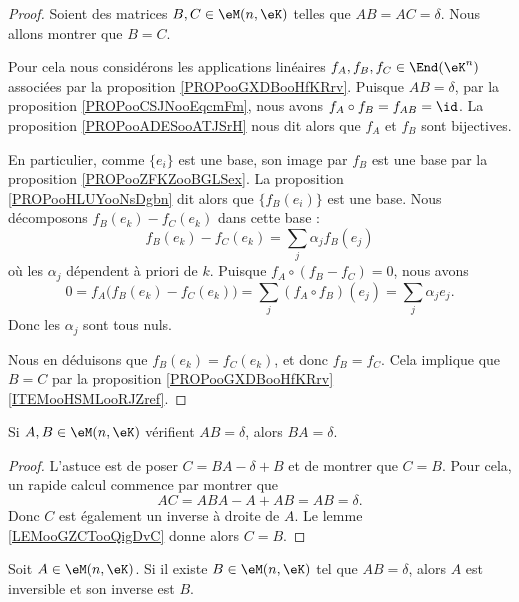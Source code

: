 \begin{proof}
	Soient des matrices \( B,C\in \eM(n,\eK)\) telles que \( AB=AC=\delta\). Nous allons montrer que \( B=C\).

	Pour cela nous considérons les applications linéaires \( f_A, f_B, f_C\in \End(\eK^n)\) associées par la proposition \ref{PROPooGXDBooHfKRrv}. Puisque \( AB=\delta\), par la proposition \ref{PROPooCSJNooEqcmFm}, nous avons \( f_A\circ f_B = f_{AB}=\id\). La proposition \ref{PROPooADESooATJSrH} nous dit alors que \( f_A\) et \( f_B\) sont bijectives.

	En particulier, comme \( \{e_i\}\) est une base, son image par \( f_B\) est une base par la proposition \ref{PROPooZFKZooBGLSex}. La proposition \ref{PROPooHLUYooNsDgbn} dit alors que \( \{f_B(e_i)\}\) est une base. Nous décomposons \( f_B(e_k)-f_C(e_k)\) dans cette base :
	\begin{equation}
		f_B(e_k)-f_C(e_k)=\sum_j\alpha_j f_B(e_j)
	\end{equation}
	où les \( \alpha_j\) dépendent à priori de \( k\). Puisque \( f_A\circ(f_B-f_C)=0\), nous avons
	\begin{equation}
		0=f_A\big( f_B(e_k)-f_C(e_k) \big)=\sum_j(f_A\circ f_B)(e_j)=\sum_j\alpha_j e_j.
	\end{equation}
	Donc les \( \alpha_j\) sont tous nuls.

	Nous en déduisons que \( f_B(e_k)=f_C(e_k)\), et donc \( f_B=f_C\). Cela implique que \( B=C\) par la proposition \ref{PROPooGXDBooHfKRrv}\ref{ITEMooHSMLooRJZref}.
\end{proof}

\begin{proposition}        \label{PROPooECIIooVMCIwz}
	Si \( A,B\in \eM(n,\eK)\) vérifient \( AB=\delta\), alors \( BA=\delta\).
\end{proposition}

\begin{proof}
	L'astuce est de poser \( C=BA-\delta+B\) et de montrer que \( C=B\). Pour cela, un rapide calcul commence par montrer que
	\begin{equation}
		AC=ABA-A+AB=AB=\delta.
	\end{equation}
	Donc \( C\) est également un inverse à droite de \( A\). Le lemme \ref{LEMooGZCTooQigDvC} donne alors \( C=B\).
\end{proof}

\begin{corollary}       \label{CORooBQLXooTeVfgb}
	Soit \( A\in \eM(n,\eK)\). Si il existe \( B\in \eM(n,\eK)\) tel que \( AB=\delta\), alors \( A\) est inversible et son inverse est \( B\).
\end{corollary}

